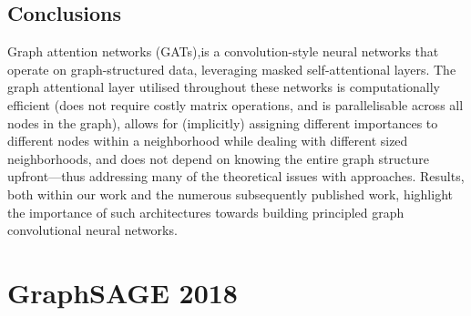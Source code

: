 \documentclass[12pt,a4paper]{article}
\begin{document}
\subsection*{Conclusions}

Graph attention networks (GATs),is a convolution-style neural networks that operate on graph-structured data, leveraging masked self-attentional layers. The graph attentional layer utilised throughout these networks is computationally efficient (does not require costly matrix operations, and is parallelisable across all nodes in the graph), allows for (implicitly) assigning different importances to different nodes within a neighborhood while dealing with different sized neighborhoods, and does not depend on knowing the entire graph structure upfront—thus addressing many of the theoretical issues with approaches. Results, both within our work and the numerous subsequently published work, highlight the importance of such architectures towards building principled graph convolutional neural networks.


\newpage


\section*{GraphSAGE 2018}
\end{document}
